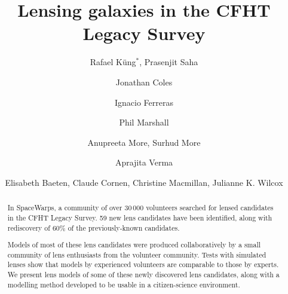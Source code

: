 \documentclass{ws-procs975x65}
\begin{document}
\title{Lensing galaxies in the CFHT Legacy Survey}

\author{ Rafael K\"ung$^*$, Prasenjit Saha }
\address{
  Physik-Institut, University of Zurich,\\
  Winterthurerstrasse 190, 8057 Zurich, Switzerland\\
  $^*$E-mail: rafael\_kueng@uzh.ch
}

\author{ Jonathan Coles }
\address{
  Exascale Research Computing Lab, Campus Teratec,\\
  2 Rue de la Piquetterie, 91680 Bruyeres-le-Chatel, France
}

\author{ Ignacio Ferreras }
\address{
  Mullard Space Science Laboratory, University College London, Holmbury St Mary, Dorking, Surrey RH5 6NT, UK
}

\author{ Phil Marshall }
\address{
  Kavli Institute for Particle Astrophysics and Cosmology, Stanford University\\
  452 Lomita Mall, Stanford, CA 94035, USA
}

\author{ Anupreeta More, Surhud More }
\address{
  Kavli Institute for the Physics and Mathematics of the Universe, University of Tokyo\\ 5-1-5 Kashiwanoha, Kashiwa-shi 277-8583, Japan
}

\author{ Aprajita Verma }
\address{
  Sub-department of Astrophysics, University of Oxford, Denys Wilkinson Building\\
  Keble Road, Oxford, OX1 3RH, UK
}

\author{ Elisabeth Baeten, Claude Cornen, Christine Macmillan, Julianne K. Wilcox }
\address{
  Zooniverse, c/o Astrophysics Department, University of Oxford\\
  Oxford OX1 3RH, UK
}





\begin{abstract}
In SpaceWarps, a community of over 30\,000 %
volunteers searched for lensed candidates in the CFHT Legacy Survey.
59 new lens candidates have been identified, along with rediscovery of 60\% of the previously-known candidates.

Models of most of these lens candidates were produced collaboratively by a small community of lens enthusiasts from the volunteer community.
Tests with simulated lenses show that models by experienced volunteers are comparable to those by experts.
We present lens models of some of these newly discovered lens candidates, along with a modelling method developed to be usable in a citizen-science environment.
\end{abstract}
\end{document}
